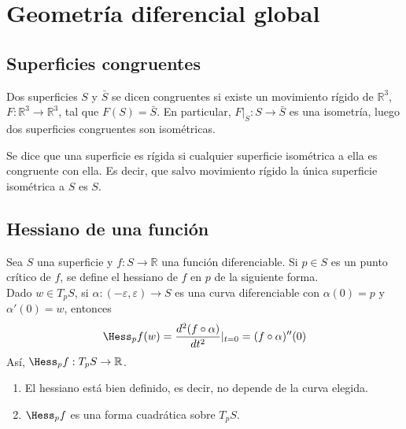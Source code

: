 \chapter{Geometría diferencial global}
\section{Superficies congruentes}

\begin{definition}
    Dos superficies $S$ y $\bar{S}$ se dicen congruentes si existe un movimiento rígido de $\mathbb{R}^3$, $F : \mathbb{R}^3 \to \mathbb{R}^3$, tal que $F(S) = \bar{S}$.
    En particular, $F|_S : S \to \bar{S}$ es una isometría, luego dos superficies congruentes son isométricas.
\end{definition}

\begin{definition}
    Se dice que una superficie es rígida si cualquier superficie isométrica a ella es congruente con ella. Es decir, que salvo movimiento rígido la única superficie isométrica a $S$ es $S$.
\end{definition}

\section{Hessiano de una función}

\begin{definition}
    Sea $S$ una superficie y $f : S \to \mathbb{R}$ una función diferenciable.
    Si $p \in S$ es un punto crítico de $f$, se define el hessiano de $f$ en $p$ de la siguiente forma.\\
    Dado $w \in T_pS$, si $\alpha : (-\varepsilon, \varepsilon) \to S$ es una curva diferenciable con $\alpha(0) = p$ y $\alpha'(0) = w$, entonces
    $$\Hess_pf(w) = \frac{d^2(f \circ \alpha)}{dt^2}|_{t=0} = (f \circ \alpha)''(0)$$
    Así, $\Hess_pf : T_pS \to \mathbb{R}$.
\end{definition}

\begin{proposition}
    \hfill
    \begin{enumerate}
        \item El hessiano está bien definido, es decir, no depende de la curva elegida.
        \item $\Hess_pf$ es una forma cuadrática sobre $T_pS$.
    \end{enumerate}
\end{proposition}

